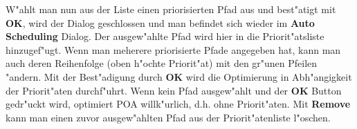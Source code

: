 \documentclass[a4paper,titlepage,12pt,ngerman]{scrbook}
\begin{document}
W"ahlt man nun aus der Liste einen priorisierten Pfad aus und best"atigt mit {\bf OK}, wird der Dialog geschlossen und man befindet sich wieder im {\bf Auto Scheduling} Dialog. Der ausgew"ahlte Pfad wird hier in die Priorit"atsliste hinzugef"ugt. Wenn man meherere priorisierte Pfade angegeben hat, kann man auch deren Reihenfolge (oben h"ochte Priorit"at) mit den gr"unen Pfeilen "andern. Mit der Best"adigung durch {\bf OK} wird die Optimierung in Abh"angigkeit der Priorit"aten durchf"uhrt.\newline
Wenn kein Pfad ausgew"ahlt und der {\bf OK} Button gedr"uckt wird, optimiert POA willk"urlich, d.h. ohne Priorit"aten.\newline
Mit {\bf Remove} kann man einen zuvor ausgew"ahlten Pfad aus der Priorit"atenliste l"oschen.

\newpage
\end{document}
